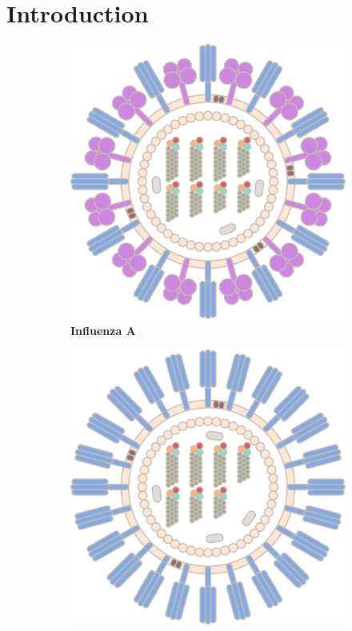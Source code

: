 \chapter{Introduction} \label{chap:1}

\begin{figure}
    \begin{adjustbox}{minipage=\dimexpr{}\fboxrule,fbox}
        \begin{subfigure}[b]{0.475\textwidth}
            \includegraphics[width=\textwidth]{Extra_Graphics/Influenza_A.pdf}
            \caption[Influenza A]{\textbf{Influenza A}}
            \label{fig:1.0.1a}
        \end{subfigure}
        \hfill
        \begin{subfigure}[b]{0.475\textwidth}
            \includegraphics[width=\textwidth]{Extra_Graphics/Influenza_B.pdf}

\end{subfigure}
\end{adjustbox}
\end{figure}
